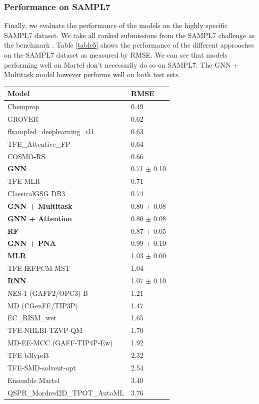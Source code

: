 \documentclass{article}
\begin{document}
\subsubsection{Performance on SAMPL7}

Finally, we evaluate the performance of the models on the highly specific SAMPL7 dataset. We take all ranked submissions from the SAMPL7 challenge as the benchmark \cite{teresa_danielle_bergazin_2021_5637494}. Table \ref{table5} shows the performance of the different approaches on the SAMPL7 dataset as measured by RMSE. We can see that models performing well on Martel don't necessarily do so on SAMPL7. The GNN + Multitask model however performs well on both test sets. \\

\begin{center}
\begin{tabular}{ | m{5cm} | m{2.5cm}| } 
  \hline
  \textbf{Model} & \textbf{RMSE} \\ 
  \hline
  Chemprop & 0.49 \\ 
  \hline
  GROVER & 0.62 \\ 
  \hline
  ffsampled\_deeplearning\_cl1 & 0.63 \\ 
  \hline
  TFE\_Attentive\_FP & 0.64 \\ 
  \hline
  COSMO-RS & 0.66 \\
  \hline
  \textbf{GNN} & 0.71 $\pm$ 0.10 \\ 
  \hline
  TFE MLR & 0.71 \\ 
  \hline
  ClassicalGSG DB3 & 0.74 \\ 
  \hline
  \textbf{GNN + Multitask} & 0.80 $\pm$ 0.08 \\
  \hline
  \textbf{GNN + Attention} & 0.80 $\pm$ 0.08 \\
  \hline
  \textbf{RF} & 0.87 $\pm$ 0.05 \\
  \hline
  \textbf{GNN + PNA} & 0.99 $\pm$ 0.10 \\
  \hline
  \textbf{MLR} & 1.03 $\pm$ 0.00 \\ 
  \hline
  TFE IEFPCM MST & 1.04 \\ 
  \hline
  \textbf{RNN} & 1.07 $\pm$ 0.10 \\
  \hline
  NES-1 (GAFF2/OPC3) B & 1.21 \\ 
  \hline
  MD (CGenFF/TIP3P)	 & 1.47 \\ 
  \hline
  EC\_RISM\_wet & 1.65 \\ 
  \hline
  TFE-NHLBI-TZVP-QM & 1.70 \\ 
  \hline
  MD-EE-MCC (GAFF-TIP4P-Ew)	 & 1.92 \\ 
  \hline
  TFE b3lypd3 & 2.32 \\ 
  \hline
  TFE-SMD-solvent-opt & 2.54 \\ 
  \hline
  Ensemble Martel & 3.40 \\ 
  \hline
  QSPR\_Mordred2D\_TPOT\_AutoML & 3.76 \\ 
  \hline
\end{tabular}
\captionsetup{width=0.8\textwidth}
\label{table5}
\end{center}
\end{document}
